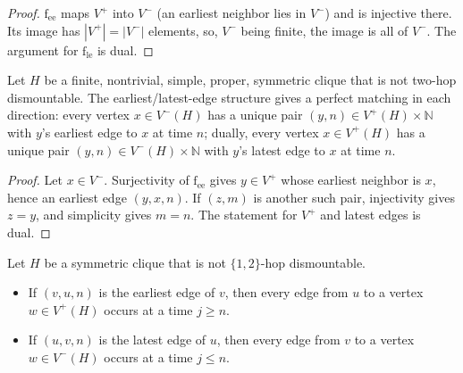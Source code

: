 \begin{proof}
  \leanok
  $\mathrm{f_{ee}}$ maps $V^+$ into $V^-$ (an earliest neighbor lies in $V^-$) and is injective there. Its image has $|V^+| = |V^-|$ elements, so, $V^-$ being finite, the image is all of $V^-$. The argument for $\mathrm{f_{le}}$ is dual.
\end{proof}

\begin{lemma}
  \label{lem:vminus-vplus-matchings}
  \leanok
  Let $H$ be a finite, nontrivial, simple, proper, symmetric clique that is not
  two-hop dismountable. The earliest/latest-edge structure gives a
  perfect matching in each direction: every vertex $x \in V^-(H)$ has a
  unique pair $(y, n) \in V^+(H) \times \mathbb{N}$ with $y$'s earliest edge
  to $x$ at time $n$; dually, every vertex $x \in V^+(H)$ has a unique pair
  $(y, n) \in V^-(H) \times \mathbb{N}$ with $y$'s latest edge to $x$ at time
  $n$.
\end{lemma}

\begin{proof}
  \leanok
  Let $x \in V^-$. Surjectivity of $\mathrm{f_{ee}}$ gives $y \in V^+$ whose earliest neighbor is $x$, hence an earliest edge $(y,x,n)$. If $(z,m)$ is another such pair, injectivity gives $z = y$, and simplicity gives $m = n$. The statement for $V^+$ and latest edges is dual.
\end{proof}

\begin{lemma}
  \label{lem:reciprocity}
  \leanok
  Let $H$ be a symmetric clique that is not $\{1,2\}$-hop dismountable.
  \begin{itemize}
    \item If $(v,u,n)$ is the earliest edge of $v$, then every edge from $u$ to a
      vertex $w \in V^+(H)$ occurs at a time $j \ge n$.
    \item If $(u,v,n)$ is the latest edge of $u$, then every edge from $v$ to a
      vertex $w \in V^-(H)$ occurs at a time $j \le n$.
  \end{itemize}
\end{lemma}

